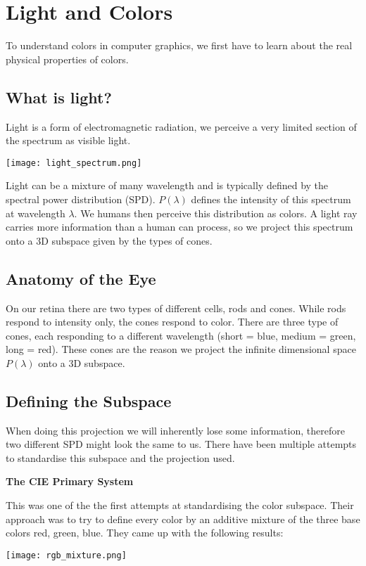 \section{Light and Colors}

To understand colors in computer graphics, we first have to learn about the real physical properties of colors.


\subsection{What is light?}

Light is a form of electromagnetic radiation, we perceive a very limited section of the spectrum as visible light.
\begin{center}
	\texttt{[image: light\_spectrum.png]}
\end{center}

Light can be a mixture of many wavelength and is typically defined by the spectral power distribution (SPD). $P(\lambda)$ defines the intensity of this spectrum at wavelength $\lambda$. We humans then perceive this distribution as colors. A light ray carries more information than a human can process, so we project this spectrum onto a 3D subspace given by the types of cones.


\subsection{Anatomy of the Eye}  

On our retina there are two types of different cells, rods and cones. While rods respond to intensity only, the cones respond to color. There are three type of cones, each responding to a different wavelength (short = blue, medium = green, long = red). These cones are the reason we project the infinite dimensional space $P(\lambda)$ onto a 3D subspace.


\subsection{Defining the Subspace}

When doing this projection we will inherently lose some information, therefore two different SPD might look the same to us. There have been multiple attempts to standardise this subspace and the projection used. \medskip

\textbf{The CIE Primary System} \smallskip

This was one of the the first attempts at standardising the color subspace. Their approach was to try to define every color by an additive mixture of the three base colors red, green, blue. They came up with the following results:
\begin{center}
	\texttt{[image: rgb\_mixture.png]}
\end{center}

